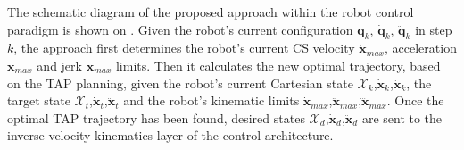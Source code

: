The schematic diagram of the proposed approach within the robot control paradigm is shown on . Given the robot's current configuration $\bm{q}_k$, $\dot{\bm{q}}_k$, $\ddot{\bm{q}}_k$ in step $k$, the approach first determines the robot's current CS velocity $\dot{\bm{x}}_{max}$, acceleration $\ddot{\bm{x}}_{max}$ and jerk $\dddot{\bm{x}}_{max}$ limits. Then it calculates the new optimal trajectory, based on the TAP planning, given the robot's current Cartesian state $\mathcal{X}_k$,$\dot{\bm{x}}_k$,$\ddot{\bm{x}}_k$, the target state $\mathcal{X}_t$,$\dot{\bm{x}}_t$,$\ddot{\bm{x}}_t$ and the robot's kinematic limits $\dot{\bm{x}}_{max}$,$\ddot{\bm{x}}_{max}$,$\dddot{\bm{x}}_{max}$. 
Once the optimal TAP trajectory has been found, desired states $\mathcal{X}_{d}$,$\dot{\bm{x}}_d$,$\ddot{\bm{x}}_d$ are sent to the inverse velocity kinematics layer of the control architecture. 

